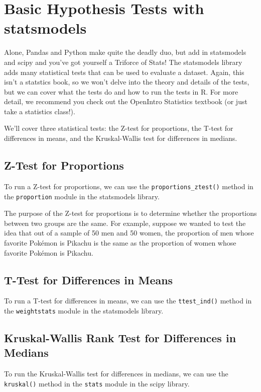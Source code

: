 \section{Basic Hypothesis Tests with statsmodels}
Alone, Pandas and Python make quite the deadly duo, but add in statsmodels and scipy and you've got yourself a Triforce of Stats! The statsmodels library adds many statistical tests that can be used to evaluate a dataset. Again, this isn't a statstics book, so we won't delve into the theory and details of the tests, but we can cover what the tests do and how to run the tests in R. For more detail, we recommend you check out the OpenIntro Statistics textbook (or just take a statistics class!).\par
We'll cover three statistical tests: the Z-test for proportions, the T-test for differences in means, and the Kruskal-Wallis test for differences in medians.
\subsection{Z-Test for Proportions}
To run a Z-test for proportions, we can use the \verb|proportions_ztest()| method in the \verb|proportion| module in the statsmodels library.\par
The purpose of the Z-test for proportions is to determine whether the proportions between two groups are the same. For example, suppose we wanted to test the idea that out of a sample of 50 men and 50 women, the proportion of men whose favorite Pok\'emon is Pikachu is the same as the proportion of women whose favorite Pok\'emon is Pikachu.
\subsection{T-Test for Differences in Means}
To run a T-test for differences in means, we can use the \verb|ttest_ind()| method in the \verb|weightstats| module in the statsmodels library.
\subsection{Kruskal-Wallis Rank Test for Differences in Medians}
To run the Kruskal-Wallis test for differences in medians, we can use the \verb|kruskal()| method in the \verb|stats| module in the scipy library.
